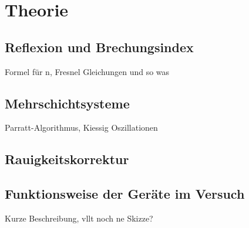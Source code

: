 \section{Theorie}
\label{sec:Theorie}

\subsection{Reflexion und Brechungsindex}
\label{theo1}

Formel für n, Fresnel Gleichungen und so was

\subsection{Mehrschichtsysteme}
\label{theo2}

Parratt-Algorithmus, Kiessig Oszillationen 

\subsection{Rauigkeitskorrektur}
\label{theo3}

\subsection{Funktionsweise der Geräte im Versuch}
\label{theo4}
 
Kurze Beschreibung, vllt noch ne Skizze?